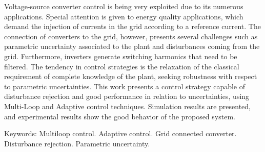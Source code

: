 
	Voltage-source converter control is being very exploited due to its numerous applications. Special attention is given to energy quality applications, which demand the injection of currents in the grid according to a reference current. The connection of converters to the grid, however, presents several challenges such as parametric uncertainty associated to the plant and disturbances coming from the grid. Furthermore, inverters generate switching harmonics that need to be filtered. The tendency in control strategies is the relaxation of the classical requirement of complete knowledge of the plant, seeking robustness with respect to parametric uncertainties. This work presents a control strategy capable of disturbance rejection and good performance in relation to uncertainties, using Multi-Loop and Adaptive control techniques. Simulation results are presented, and experimental results show the good behavior of the proposed system.

 \vspace{\onelineskip}

 \noindent
 Keywords: Multiloop control. Adaptive control. Grid connected converter. Disturbance rejection. Parametric uncertainty.
